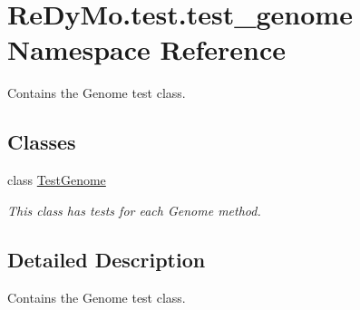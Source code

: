 \hypertarget{namespaceReDyMo_1_1test_1_1test__genome}{}\section{Re\+Dy\+Mo.\+test.\+test\+\_\+genome Namespace Reference}
\label{namespaceReDyMo_1_1test_1_1test__genome}


Contains the Genome test class.  


\subsection*{Classes}
\begin{DoxyCompactItemize}
\item 
class \mbox{\hyperlink{classReDyMo_1_1test_1_1test__genome_1_1TestGenome}{Test\+Genome}}
\begin{DoxyCompactList}\small\item\em This class has tests for each Genome method. \end{DoxyCompactList}\end{DoxyCompactItemize}


\subsection{Detailed Description}
Contains the Genome test class. 
